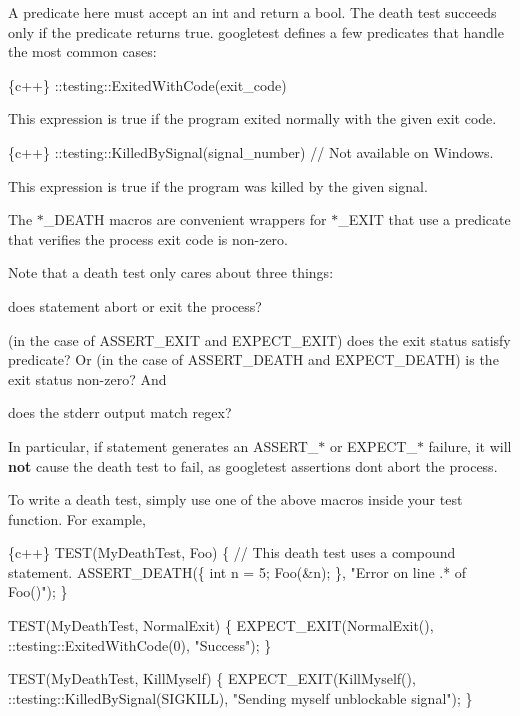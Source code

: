 A predicate here must accept an {\ttfamily int} and return a {\ttfamily bool}. The death test succeeds only if the predicate returns {\ttfamily true}. googletest defines a few predicates that handle the most common cases\+:


\begin{DoxyCode}
\{c++\}
::testing::ExitedWithCode(exit\_code)
\end{DoxyCode}


This expression is {\ttfamily true} if the program exited normally with the given exit code.


\begin{DoxyCode}
\{c++\}
::testing::KilledBySignal(signal\_number)  // Not available on Windows.
\end{DoxyCode}


This expression is {\ttfamily true} if the program was killed by the given signal.

The {\ttfamily $\ast$\+\_\+\+D\+E\+A\+TH} macros are convenient wrappers for {\ttfamily $\ast$\+\_\+\+E\+X\+IT} that use a predicate that verifies the process\textquotesingle{} exit code is non-\/zero.

Note that a death test only cares about three things\+:


\begin{DoxyEnumerate}
\item does {\ttfamily statement} abort or exit the process?
\item (in the case of {\ttfamily A\+S\+S\+E\+R\+T\+\_\+\+E\+X\+IT} and {\ttfamily E\+X\+P\+E\+C\+T\+\_\+\+E\+X\+IT}) does the exit status satisfy {\ttfamily predicate}? Or (in the case of {\ttfamily A\+S\+S\+E\+R\+T\+\_\+\+D\+E\+A\+TH} and {\ttfamily E\+X\+P\+E\+C\+T\+\_\+\+D\+E\+A\+TH}) is the exit status non-\/zero? And
\item does the stderr output match {\ttfamily regex}?
\end{DoxyEnumerate}

In particular, if {\ttfamily statement} generates an {\ttfamily A\+S\+S\+E\+R\+T\+\_\+$\ast$} or {\ttfamily E\+X\+P\+E\+C\+T\+\_\+$\ast$} failure, it will {\bfseries not} cause the death test to fail, as googletest assertions don\textquotesingle{}t abort the process.

To write a death test, simply use one of the above macros inside your test function. For example,


\begin{DoxyCode}
\{c++\}
TEST(MyDeathTest, Foo) \{
  // This death test uses a compound statement.
  ASSERT\_DEATH(\{
    int n = 5;
    Foo(&n);
  \}, "Error on line .* of Foo()");
\}

TEST(MyDeathTest, NormalExit) \{
  EXPECT\_EXIT(NormalExit(), ::testing::ExitedWithCode(0), "Success");
\}

TEST(MyDeathTest, KillMyself) \{
  EXPECT\_EXIT(KillMyself(), ::testing::KilledBySignal(SIGKILL),
              "Sending myself unblockable signal");
\}
\end{DoxyCode}


